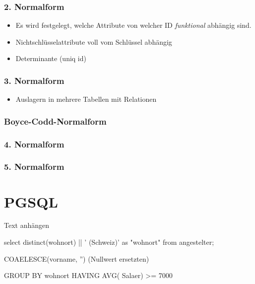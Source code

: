 \begin{multicols}{2}
\subsubsection{2. Normalform}

	\begin{itemize}
		\item Es wird festgelegt, welche Attribute von welcher ID \emph{funktional} abhängig sind.
		\item Nichtschlüsselattribute voll vom Schlüssel abhängig
		\item Determinante (uniq id)
	\end{itemize}

\subsubsection{3. Normalform}
	\begin{itemize}
		\item Auslagern in mehrere Tabellen mit Relationen
	\end{itemize}

\subsubsection{Boyce-Codd-Normalform}
\subsubsection{4. Normalform}
\subsubsection{5. Normalform}


\section{PGSQL}

Text anhängen 

\begin{sql}
	select distinct(wohnort) || ' (Schweiz)' as "wohnort" from angestelter;
\end{sql}

COAELESCE(vorname, '') (Nullwert ersetzten)


GROUP BY wohnort HAVING AVG( Salaer) >= 7000

\end{multicols}



